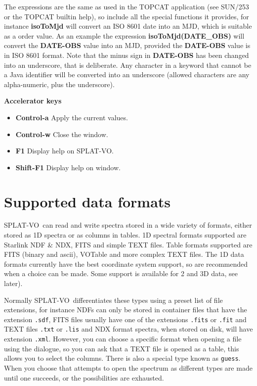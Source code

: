 \documentclass[twoside,11pt,nolof]{starlink}
\providecommand{\SPLAT}{\textsf{SPLAT-VO}}
\newcommand{\submenuitem}[2]{\latexhtml{\textbf{#1$\rightarrow$#2}}{\textbf{#1->#2}}}
\newcommand{\labelitem}[1]{\textbf{#1}}
\providecommand{\hitext}[1]{\texttt{#1}}
\providecommand{\subheading}[1]{\textbf{\large{#1}}}
\begin{document}
The expressions are the same as used in the TOPCAT application (see SUN/253 or
the TOPCAT builtin help), so include all the special functions it provides,
for instance \labelitem{isoToMjd} will convert an ISO 8601 date into an MJD,
which is suitable as a order value. As an example the expression
\labelitem{isoToMjd(DATE\_OBS)} will convert the
\labelitem{DATE-OBS} value into an MJD, provided the \labelitem{DATE-OBS}
value is in ISO 8601 format. Note that the minus sign in \labelitem{DATE-OBS}
has been changed into an underscore, that is deliberate. Any character in a
keyword that cannot be a Java identifier will be converted into an underscore
(allowed characters are any alpha-numeric, plus the underscore).

\subheading{Accelerator keys}

\begin{itemize}
\item \labelitem{Control-a} Apply the current values.

\item \labelitem{Control-w} Close the window.
\item \labelitem{F1} Display help on \SPLAT.
\item \labelitem{Shift-F1} Display help on window.
\end{itemize}

\newpage
\section{Supported data formats}

\SPLAT\ can read and write spectra stored in a wide variety of formats, either
stored as 1D spectra or as columns in tables. 1D spectral formats supported
are Starlink NDF \& NDX, FITS and simple TEXT files. Table formats supported
are FITS (binary and ascii), VOTable and more complex TEXT files. The 1D data
formats currently have the best coordinate system support, so are recommended
when a choice can be made. Some support is available for 2 and 3D data, see
later).

Normally \SPLAT\ differentiates these types using a preset list of file
extensions, for instance NDFs can only be stored in container files that have
the extension \hitext{.sdf}, FITS files usually have one of the extensions
\hitext{.fits} or \hitext{.fit} and TEXT files \hitext{.txt} or \hitext{.lis}
and NDX format spectra, when stored on disk, will have extension
\hitext{.xml}. However, you can choose a specific format when opening a file
using the \submenuitem{File}{Open} dialogue, so you can ask that a TEXT file
is opened as a table, this allows you to select the columns. There is also a
special type known as \hitext{guess}. When you choose that attempts to open
the spectrum as different types are made until one succeeds, or the
possibilities are exhausted.
\end{document}
